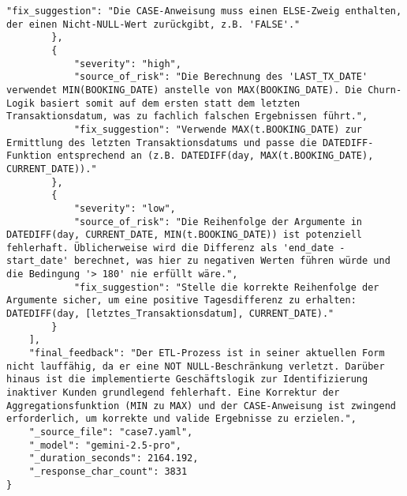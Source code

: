 \begin{lstlisting}[caption={Ausgabe: GEMINI 2.5 Pro Anwendungsfall 7 Konsistenzdurchlauf},label={gemini_case7_prompt2}]
            "fix_suggestion": "Die CASE-Anweisung muss einen ELSE-Zweig enthalten, der einen Nicht-NULL-Wert zurückgibt, z.B. 'FALSE'."
        },
        {
            "severity": "high",
            "source_of_risk": "Die Berechnung des 'LAST_TX_DATE' verwendet MIN(BOOKING_DATE) anstelle von MAX(BOOKING_DATE). Die Churn-Logik basiert somit auf dem ersten statt dem letzten Transaktionsdatum, was zu fachlich falschen Ergebnissen führt.",
            "fix_suggestion": "Verwende MAX(t.BOOKING_DATE) zur Ermittlung des letzten Transaktionsdatums und passe die DATEDIFF-Funktion entsprechend an (z.B. DATEDIFF(day, MAX(t.BOOKING_DATE), CURRENT_DATE))."
        },
        {
            "severity": "low",
            "source_of_risk": "Die Reihenfolge der Argumente in DATEDIFF(day, CURRENT_DATE, MIN(t.BOOKING_DATE)) ist potenziell fehlerhaft. Üblicherweise wird die Differenz als 'end_date - start_date' berechnet, was hier zu negativen Werten führen würde und die Bedingung '> 180' nie erfüllt wäre.",
            "fix_suggestion": "Stelle die korrekte Reihenfolge der Argumente sicher, um eine positive Tagesdifferenz zu erhalten: DATEDIFF(day, [letztes_Transaktionsdatum], CURRENT_DATE)."
        }
    ],
    "final_feedback": "Der ETL-Prozess ist in seiner aktuellen Form nicht lauffähig, da er eine NOT NULL-Beschränkung verletzt. Darüber hinaus ist die implementierte Geschäftslogik zur Identifizierung inaktiver Kunden grundlegend fehlerhaft. Eine Korrektur der Aggregationsfunktion (MIN zu MAX) und der CASE-Anweisung ist zwingend erforderlich, um korrekte und valide Ergebnisse zu erzielen.",
    "_source_file": "case7.yaml",
    "_model": "gemini-2.5-pro",
    "_duration_seconds": 2164.192,
    "_response_char_count": 3831
}
\end{lstlisting}

